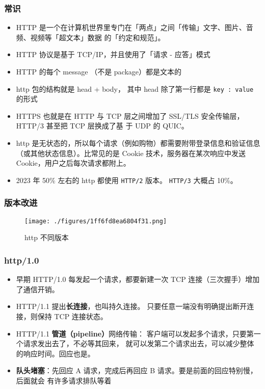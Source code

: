 
\begin{issues}
\issueDraft
\end{issues}

\subsubsection{常识}
\begin{itemize}
\item HTTP 是一个在计算机世界里专门在「两点」之间「传输」文字、图片、音频、视频等「超文本」数据 的「约定和规范」。
\item HTTP 协议是基于  TCP/IP，并且使用了「请求 - 应答」模式
\item HTTP 的每个 message （不是 package）都是文本的
\item http 包的结构就是 head + body， 其中 head 除了第一行都是 \verb`key : value` 的形式
\item HTTPS 也就是在 HTTP 与 TCP 层之间增加了 SSL/TLS 安全传输层，HTTP/3 甚至把 TCP 层换成了基 于 UDP 的 QUIC。
\item http 是无状态的，所以每个请求（例如购物）都需要附带登录信息和验证信息（或其他状态信息）。比常见的是 Cookie 技术，服务器在某次响应中发送 Cookie，用户之后每次请求都附上。
\item 2023 年 50\% 左右的 http 都使用 \verb`HTTP/2` 版本。 \verb`HTTP/3` 大概占 10\%。
\end{itemize}

\subsubsection{版本改进}

\begin{figure}[ht]
\centering
\texttt{[image: ./figures/1ff6fd8ea6804f31.png]}
\caption{http 不同版本} \label{fig_http_1}
\end{figure}

\subsubsection{http/1.0}
\begin{itemize}
\item 早期 HTTP/1.0 每发起一个请求，都要新建一次 TCP 连接（三次握手）增加了通信开销。
\item HTTP/1.1 提出\textbf{长连接}，也叫持久连接。 只要任意一端没有明确提出断开连接，则保持 TCP 连接状态。
\item HTTP/1.1 \textbf{管道（pipeline）}网络传输： 客户端可以发起多个请求，只要第一个请求发出去了，不必等其回来， 就可以发第二个请求出去，可以减少整体的响应时间。回应也是。
\item \textbf{队头堵塞}：先回应 A 请求，完成后再回应 B 请求。要是前面的回应特别慢，后面就会 有许多请求排队等着
\end{itemize}

